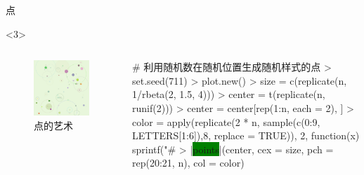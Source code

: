 \documentclass{beamerthemeMono}
\begin{document}
\begin{frame}[t,fragile]{\subsecname}{点}
\begin{overlayarea}{\textwidth}{\textheight}
\begin{onlyenv}<3>
  \begin{columns}
    \begin{column}{.4\textwidth}
\centering
\begin{figure}
  \includegraphics[width=\columnwidth]{points-art02.png}
  \caption{点的艺术}
\end{figure}
    \end{column}

    \begin{column}{.6\textwidth}
\centering
\begin{rcode}
# 利用随机数在随机位置生成随机样式的点
> set.seed(711)
> plot.new()
> size = c(replicate(n, 1/rbeta(2, 1.5, 4)))
> center = t(replicate(n, runif(2)))
> center = center[rep(1:n, each = 2), ]
> color = apply(replicate(2 * n, sample(c(0:9, LETTERS[1:6]),8, replace = TRUE)),
              2, function(x) sprintf("#%
> |\colorbox{green}{points}|(center, cex = size, pch = rep(20:21, n), col = color)
\end{rcode}
    \end{column}
  \end{columns}
\end{onlyenv}


\end{overlayarea}
\end{frame}
\end{document}
